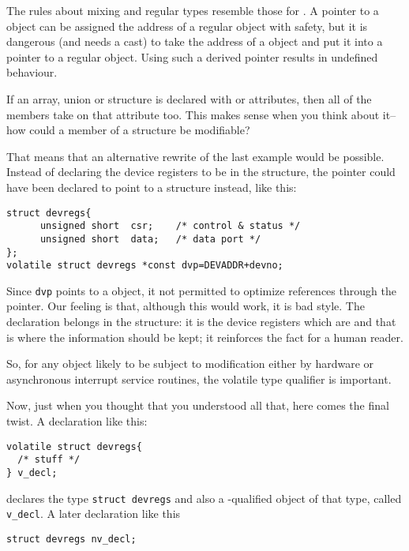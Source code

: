    The rules about mixing \volatile{} and regular types
    resemble those for \const. A pointer to
    a \volatile{} object can be assigned the address of a regular
    object with safety, but it is dangerous (and needs a cast) to take the
    address of a \volatile{} object and put it into a pointer to
    a regular object. Using such a derived pointer results in undefined
    behaviour.


   If an array, union or structure is declared with \const{} or
    \volatile{} attributes, then all of the members take on that
    attribute too. This makes sense when you think about it--how could
    a member of a \const{} structure be modifiable?


   That means that an alternative rewrite of the last example would be
    possible. Instead of declaring the device registers to be
    \volatile{} in the structure, the pointer could have been
    declared to point to a \volatile{} structure instead, like
    this:


\begin{Verbatim}
struct devregs{
      unsigned short  csr;    /* control & status */
      unsigned short  data;   /* data port */
};
volatile struct devregs *const dvp=DEVADDR+devno;
\end{Verbatim}

   Since \texttt{dvp} points to a \volatile{} object, it
    not permitted to optimize references through the pointer. Our feeling is
    that, although this would work, it is bad style. The
    \volatile{} declaration belongs in the structure: it is the
    device registers which are \volatile{} and that is where the
    information should be kept; it reinforces the fact for a human
    reader.


   So, for any object likely to be subject to modification either by
    hardware or asynchronous interrupt service routines, the volatile type
    qualifier is important.


   Now, just when you thought that you understood all that, here comes
    the final twist. A declaration like this:


\begin{Verbatim}
volatile struct devregs{
  /* stuff */
} v_decl;
\end{Verbatim}

   declares the type \texttt{struct devregs} and also
    a \volatile-qualified object of that type, called
    \texttt{v\_decl}. A later declaration like this


\begin{Verbatim}
struct devregs nv_decl;
\end{Verbatim}

